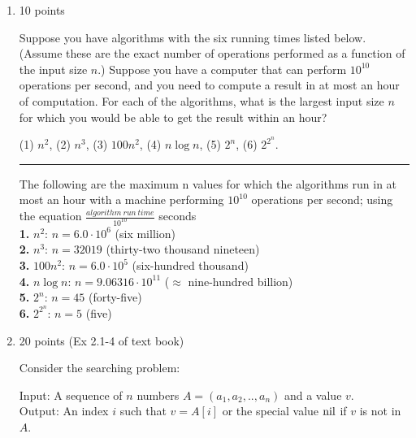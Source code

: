 \documentclass[letterpaper,12pt]{article}
\newcommand{\nil}{{\mathop{\rm nil}}}
\begin{document}
\begin{enumerate}
\item 10 points 

Suppose you have algorithms with the six running times listed below.
(Assume these are the exact number of operations performed as a function
of the input size $n$.) Suppose you have a computer that can perform
$10^{10}$ operations per second, and you need to compute a result in at most
an hour of computation. For each of the algorithms, what is the largest
input size $n$ for which you would be able to get the result within an hour?

(1) $n^2$, (2) $n^3$, (3) $100n^2$, (4) $n \log n$, (5) $2^n$, (6) $2^{2^n}$.
\\ \noindent\rule{16cm}{0.1pt}
The following are the maximum n values for which the algorithms run in at most an hour with a machine performing $10^{10}$ operations per second; using the equation \(\frac{algorithm \ run \ time}{10^{10}}\) seconds\\
\textbf{1.} $n^2$: \(n=6.0\cdot10^6\) (six million) \\
\textbf{2.} $n^3$: \(n=32019\) (thirty-two thousand nineteen) \\
\textbf{3.} $100n^2$: \(n=6.0\cdot10^5\) (six-hundred thousand) \\
\textbf{4.} $n \log n$: \(n=9.06316\cdot10^{11}\) (\(\approx\) nine-hundred billion) \\
\textbf{5.} $2^n$: \(n=45\) (forty-five) \\
\textbf{6.} $2^{2^n}$: \(n=5\) (five) \\

\item 20 points (Ex 2.1-4 of text book)

Consider the searching problem:

Input: A sequence of $n$ numbers $A=(a_1,a_2,..,a_n)$ and a value $v$.\\
Output: An index $i$ such that $v=A[i]$ or the special value $\nil$ if $v$
is not in $A$.


\end{enumerate}
\end{document}

